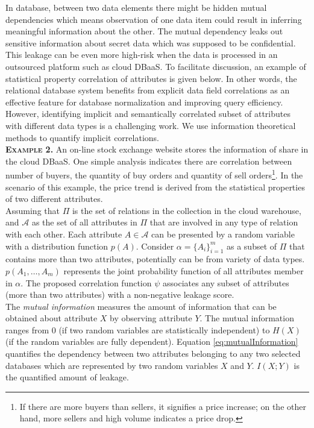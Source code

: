 In database, between two data elements there might be hidden mutual dependencies which means observation of one data item could result in inferring meaningful information about the other. The mutual dependency leaks out sensitive information about secret data which was supposed to be confidential. This leakage can be even more high-risk when the data is processed in an outsourced platform such as cloud DBaaS. To facilitate discussion, an example of statistical property correlation of attributes is given below. In other words, the relational database system benefits from explicit data field correlations as an effective feature for database normalization and improving query efficiency. However, identifying implicit and semantically correlated subset of attributes with different data types is a challenging work. We use information theoretical methods to quantify implicit correlations.\\


\textbf{\textsc{Example 2.}} An on-line stock exchange website stores the information of share in the cloud DBaaS. One simple analysis indicates there are correlation between number of buyers, the quantity of buy orders and quantity of sell orders\footnote{If there are more buyers than sellers, it signifies a price increase; on the other hand, more sellers and high volume indicates a price drop. }. In the scenario of this example, the price trend is derived from the statistical properties of two different attributes.\\

Assuming that $\Pi$ is the set of relations in the collection in the cloud warehouse, and $\mathcal{A}$ as the set of all attributes in $\Pi$ that are involved in any type of relation with each other. Each attribute $A\in \mathcal{A}$ can be presented by a random variable with a distribution function $p(A)$. Consider $\alpha=\{A_i\}^m_{i=1}$ as a subset of $\Pi$  that contains more than two attributes, potentially can be from variety of data types. $p(A_1, \dots,A_m)$ represents the joint probability function of all attributes member in $\alpha$. The proposed correlation function $\psi$ associates any subset of attributes (more than two attributes) with a non-negative leakage score.\\  

\noindent The {\it mutual information} measures the amount of information that can be obtained about attribute $X$ by observing attribute $Y$. The mutual information ranges from $0$ (if two random variables are statistically independent) to $H(X)$ (if the random variables are fully dependent). Equation \ref{eq:mutualInformation} quantifies the dependency between two attributes belonging to any two selected databases which are represented by two random variables $X$ and $Y$. $I(X; Y)$ is the quantified amount of leakage.

